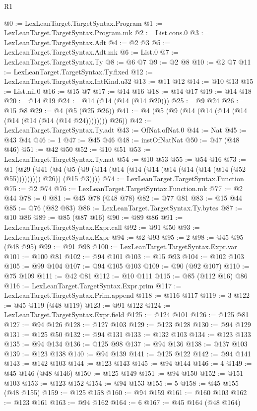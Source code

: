 \begin{lexlean}{R1}
\begin{coremodule}
@0 := LexLeanTarget.TargetSyntax.Program
@1 := LexLeanTarget.TargetSyntax.Program.mk
@2 := List.cons.{0}
@3 := LexLeanTarget.TargetSyntax.Adt
@4 := @2 @3
@5 := LexLeanTarget.TargetSyntax.Adt.mk
@6 := List.{0}
@7 := LexLeanTarget.TargetSyntax.Ty
@8 := @6 @7
@9 := @2 @8
@10 := @2 @7
@11 := LexLeanTarget.TargetSyntax.Ty.fixed
@12 := LexLeanTarget.TargetSyntax.IntKind.u32
@13 := @11 @12
@14 := @10 @13
@15 := List.nil.{0}
@16 := @15 @7
@17 := @14 @16
@18 := @14 @17
@19 := @14 @18
@20 := @14 @19
@24 := @14 (@14 (@14 (@14 @20)))
@25 := @9 @24
@26 := @15 @8
@29 := @4 (@5 (@25 @26))
@41 := @4 (@5 (@9 (@14 (@14 (@14 (@14 (@14 (@14 (@14 (@14 @24)))))))) @26))
@42 := LexLeanTarget.TargetSyntax.Ty.adt
@43 := OfNat.ofNat.{0}
@44 := Nat
@45 := @43 @44
@46 := 1
@47 := @45 @46
@48 := instOfNatNat
@50 := @47 (@48 @46)
@51 := @42 @50
@52 := @10 @51
@53 := LexLeanTarget.TargetSyntax.Ty.nat
@54 := @10 @53
@55 := @54 @16
@73 := @1
    (@29
      (@41 (@4 (@5 (@9 (@14 (@14 (@14 (@14 (@14 (@14 (@14 (@14 (@52 @55))))))))) @26)) (@15 @3))))
@74 := LexLeanTarget.TargetSyntax.Function
@75 := @2 @74
@76 := LexLeanTarget.TargetSyntax.Function.mk
@77 := @2 @44
@78 := 0
@81 := @45 @78 (@48 @78)
@82 := @77 @81
@83 := @15 @44
@85 := @76 (@82 @83)
@86 := LexLeanTarget.TargetSyntax.Ty.bytes
@87 := @10 @86
@89 := @85 (@87 @16)
@90 := @89 @86
@91 := LexLeanTarget.TargetSyntax.Expr.call
@92 := @91 @50
@93 := LexLeanTarget.TargetSyntax.Expr
@94 := @2 @93
@95 := 2
@98 := @45 @95 (@48 @95)
@99 := @91 @98
@100 := LexLeanTarget.TargetSyntax.Expr.var
@101 := @100 @81
@102 := @94 @101
@103 := @15 @93
@104 := @102 @103
@105 := @99 @104
@107 := @94 @105 @103
@109 := @90 (@92 @107)
@110 := @75 @109
@111 := @42 @81
@112 := @10 @111
@115 := @85 (@112 @16) @86
@116 := LexLeanTarget.TargetSyntax.Expr.prim
@117 := LexLeanTarget.TargetSyntax.Prim.append
@118 := @116 @117
@119 := 3
@122 := @45 @119 (@48 @119)
@123 := @91 @122
@124 := LexLeanTarget.TargetSyntax.Expr.field
@125 := @124 @101
@126 := @125 @81
@127 := @94 @126
@128 := @127 @103
@129 := @123 @128
@130 := @94 @129
@131 := @125 @50
@132 := @94 @131
@133 := @132 @103
@134 := @123 @133
@135 := @94 @134
@136 := @125 @98
@137 := @94 @136
@138 := @137 @103
@139 := @123 @138
@140 := @94 @139
@141 := @125 @122
@142 := @94 @141
@143 := @142 @103
@144 := @123 @143
@145 := @94 @144
@146 := 4
@149 := @45 @146 (@48 @146)
@150 := @125 @149
@151 := @94 @150
@152 := @151 @103
@153 := @123 @152
@154 := @94 @153
@155 := 5
@158 := @45 @155 (@48 @155)
@159 := @125 @158
@160 := @94 @159
@161 := @160 @103
@162 := @123 @161
@163 := @94 @162
@164 := 6
@167 := @45 @164 (@48 @164)

\end{coremodule}
\end{lexlean}
